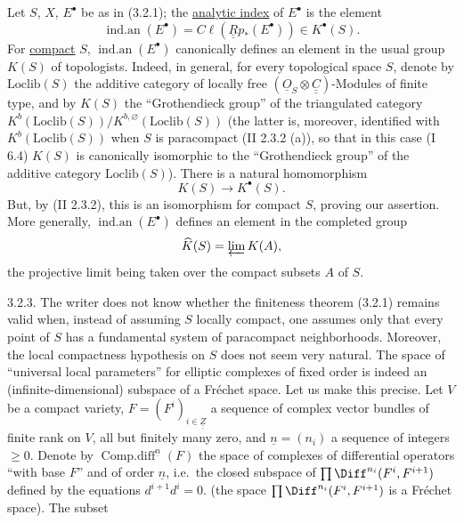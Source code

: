 Let $S$, $X$, $E^\bullet$ be as in (3.2.1); the \uline{analytic index} of $E^\bullet$ is the element
\[
  \operatorname{ind.an}(E^\bullet)=C\ell(\underline{\underline{R}}p_*(E^\bullet))\in K^\bullet(S).
\]
%
For \uline{compact} $S$, $\operatorname{ind.an}(E^\bullet)$ canonically defines an element in the usual group $K(S)$ of topologists. Indeed, in general, for every topological space $S$, denote by $\mathrm{Loclib}(S)$ the additive category of locally free $(\underline{O}_S\otimes\underline{\underline{C}})$-Modules of finite type, and by $K(S)$ the \textquotedblleft Grothendieck group\textquotedblright{} of the triangulated category $K^b(\mathrm{Loclib}(S))/K^{b,\varnothing}(\mathrm{Loclib}(S))$ (the latter is, moreover, identified with $K^b(\mathrm{Loclib}(S))$ when $S$ is paracompact (II 2.3.2 (a)), so that in this case (I 6.4) $K(S)$ is canonically isomorphic to the \textquotedblleft Grothendieck group\textquotedblright{} of the additive category $\mathrm{Loclib}(S)$). There is a natural homomorphism
\[
  K(S)\longrightarrow K^\bullet(S).
\]
But, by (II 2.3.2), this is an isomorphism for compact $S$, proving our assertion. More generally, $\operatorname{ind.an}(E^\bullet)$ defines an element in the completed group
\[
  \widehat K(S)=\varprojlim K(A),
\]
the projective limit being taken over the compact subsets $A$ of $S$.

3.2.3. The writer does not know whether the finiteness theorem (3.2.1) remains valid when, instead of assuming $S$ locally compact, one assumes only that every point of $S$ has a fundamental system of paracompact neighborhoods. Moreover, the local compactness hypothesis on $S$ does not seem very natural. The space of \textquotedblleft universal local parameters\textquotedblright{} for elliptic complexes of fixed order is indeed an (infinite-dimensional) subspace of a Fréchet space. Let us make this precise. Let $V$ be a compact variety, $F=(F^i)_{i\in\underline{\underline{Z}}}$ a sequence of complex vector bundles of finite rank on $V$, all but finitely many zero, and $\underline n=(n_i)$ a sequence of integers $\geq 0$. Denote by $\operatorname{Comp.diff}^{\underline n}(F)$ the space of complexes of differential operators \textquotedblleft with base $F$\textquotedblright{} and of order $\underline n$, i.e.\ the closed subspace of $\prod\Diff^{n_i}(F^i,F^{i+1})$ defined by the equations $d^{i+1}d^i=0$. (the space $\prod\Diff^{n_i}(F^i,F^{i+1})$ is a Fréchet space). The subset
